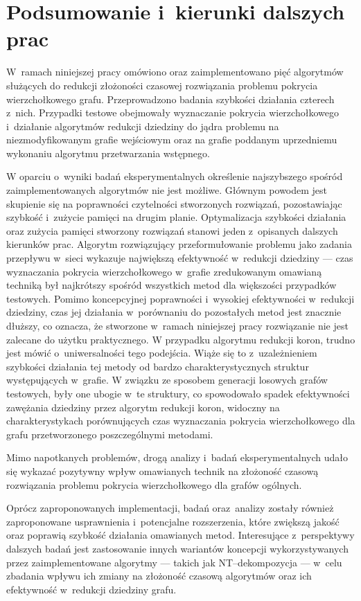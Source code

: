 \chapter{Podsumowanie i~kierunki dalszych prac}
\label{summary}
  W~ramach niniejszej pracy omówiono oraz zaimplementowano pięć algorytmów służących do redukcji złożoności czasowej rozwiązania problemu pokrycia wierzchołkowego grafu. Przeprowadzono badania szybkości działania czterech z~nich.
  Przypadki testowe obejmowały wyznaczanie pokrycia wierzchołkowego i~działanie algorytmów redukcji dziedziny do jądra problemu na niezmodyfikowanym grafie wejściowym oraz na grafie poddanym uprzedniemu wykonaniu algorytmu przetwarzania wstępnego.

  W oparciu o~wyniki badań eksperymentalnych określenie najszybszego spośród zaimplementowanych algorytmów nie jest możliwe.
  Głównym powodem jest skupienie się na poprawności czytelności stworzonych rozwiązań, pozostawiając szybkość i~zużycie pamięci na drugim planie.
  Optymalizacja szybkości działania oraz zużycia pamięci stworzony rozwiązań stanowi jeden z~opisanych dalszych kierunków prac.
  Algorytm rozwiązujący przeformułowanie problemu jako zadania przepływu w~sieci wykazuje największą efektywność w~redukcji dziedziny --- czas wyznaczania pokrycia wierzchołkowego w~grafie zredukowanym omawianą techniką był najkrótszy spośród wszystkich metod dla większości przypadków testowych.
  Pomimo koncepcyjnej poprawności i~wysokiej efektywności w~redukcji dziedziny, czas jej działania w~porównaniu do pozostałych metod jest znacznie dłuższy, co oznacza, że stworzone w~ramach niniejszej pracy rozwiązanie nie jest zalecane do użytku praktycznego.
  W przypadku algorytmu redukcji koron, trudno jest mówić o~uniwersalności tego podejścia.
  Wiąże się to z~uzależnieniem szybkości działania tej metody od bardzo charakterystycznych struktur występujących w~grafie.
  W związku ze sposobem generacji losowych grafów testowych, były one ubogie w~te struktury, co spowodowało spadek efektywności zawężania dziedziny przez algorytm redukcji koron, widoczny na charakterystykach porównujących czas wyznaczania pokrycia wierzchołkowego dla grafu przetworzonego poszczególnymi metodami.

  Mimo napotkanych problemów, drogą analizy i~badań eksperymentalnych udało się wykazać pozytywny wpływ omawianych technik na złożoność czasową rozwiązania problemu pokrycia wierzchołkowego dla grafów ogólnych.

  Oprócz zaproponowanych implementacji, badań oraz~analizy zostały również zaproponowane usprawnienia i~potencjalne rozszerzenia, które zwiększą jakość oraz poprawią szybkość działania omawianych metod.
  Interesujące z~perspektywy dalszych badań jest zastosowanie innych wariantów koncepcji wykorzystywanych przez zaimplementowane algorytmy --- takich jak NT--dekompozycja --- w~celu zbadania wpływu ich zmiany na złożoność czasową algorytmów oraz ich efektywność w~redukcji dziedziny grafu.

